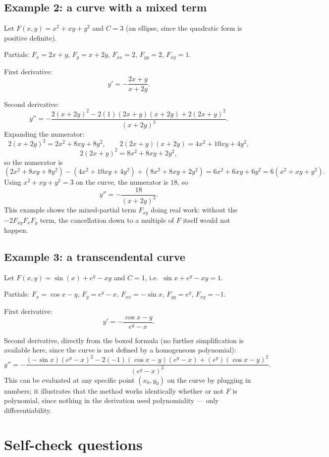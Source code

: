 \documentclass{essay}
\begin{document}
\subsection*{Example 2: a curve with a mixed term}

Let $F(x,y) = x^2 + xy + y^2$ and $C = 3$ (an ellipse, since the quadratic form is positive
definite).

Partials: $F_x = 2x + y$, $F_y = x + 2y$, $F_{xx} = 2$, $F_{yy} = 2$, $F_{xy} = 1$.

First derivative:
\[
  y' = -\frac{2x+y}{x+2y}.
\]

Second derivative:
\[
  y'' = -\frac{2(x+2y)^2 - 2(1)(2x+y)(x+2y) + 2(2x+y)^2}{(x+2y)^3}.
\]
Expanding the numerator:
\[
  2(x+2y)^2 = 2x^2 + 8xy + 8y^2, \qquad
  2(2x+y)(x+2y) = 4x^2 + 10xy + 4y^2,
\]
\[
  2(2x+y)^2 = 8x^2 + 8xy + 2y^2,
\]
so the numerator is
\[
  (2x^2+8xy+8y^2) - (4x^2+10xy+4y^2) + (8x^2+8xy+2y^2) = 6x^2 + 6xy + 6y^2 = 6(x^2+xy+y^2).
\]
Using $x^2 + xy + y^2 = 3$ on the curve, the numerator is $18$, so
\[
  y'' = -\frac{18}{(x+2y)^3}.
\]
This example shows the mixed-partial term $F_{xy}$ doing real work: without the $-2F_{xy}F_xF_y$
term, the cancellation down to a multiple of $F$ itself would not happen.

\subsection*{Example 3: a transcendental curve}

Let $F(x,y) = \sin(x) + e^{y} - xy$ and $C = 1$, i.e.\ $\sin x + e^y - xy = 1$.

Partials: $F_x = \cos x - y$, $F_y = e^y - x$, $F_{xx} = -\sin x$, $F_{yy} = e^y$,
$F_{xy} = -1$.

First derivative:
\[
  y' = -\frac{\cos x - y}{e^y - x}.
\]

Second derivative, directly from the boxed formula (no further simplification is available
here, since the curve is not defined by a homogeneous polynomial):
\[
  y'' = -\frac{(-\sin x)(e^y-x)^2 - 2(-1)(\cos x - y)(e^y - x) + (e^y)(\cos x - y)^2}
  {(e^y - x)^3}.
\]
This can be evaluated at any specific point $(x_0, y_0)$ on the curve by plugging in numbers;
it illustrates that the method works identically whether or not $F$ is polynomial, since
nothing in the derivation used polynomiality — only differentiability.

\section{Self-check questions}
\end{document}
